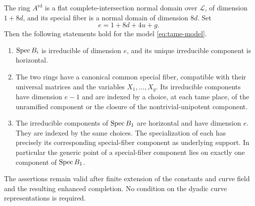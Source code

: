 \begin{proposition}\label{prop:local-geometry}
The ring $A^{\mathrm{rd}}$ is a flat complete-intersection normal
domain over $\mathcal L$, of dimension $1+8d$, and its special fiber
is a normal domain of dimension $8d$.  Set
\[
e=1+8d+4u+g.
\]
Then the following statements hold for the model
\eqref{eq:tame-model}.
\begin{enumerate}
\item $\operatorname{Spec} B_i$ is irreducible of dimension $e$, and its unique
irreducible component is horizontal.
\item The two rings have a canonical common special fiber, compatible
with their universal matrices and the variables $X_1,\ldots,X_g$.
Its irreducible components have dimension $e-1$ and are indexed by a
choice, at each tame place, of the unramified component or the closure
of the nontrivial-unipotent component.
\item The irreducible components of $\operatorname{Spec} B_1$ are horizontal and
have dimension $e$.  They are indexed by the same choices.  The
specialization of each has precisely its corresponding special-fiber
component as underlying support.  In particular the generic point
of a special-fiber component lies on exactly one component of
$\operatorname{Spec} B_1$.
\end{enumerate}
The assertions remain valid after finite extension of the constants
and curve field and the resulting enhanced completion.  No condition
on the dyadic curve representations is required.
\end{proposition}

